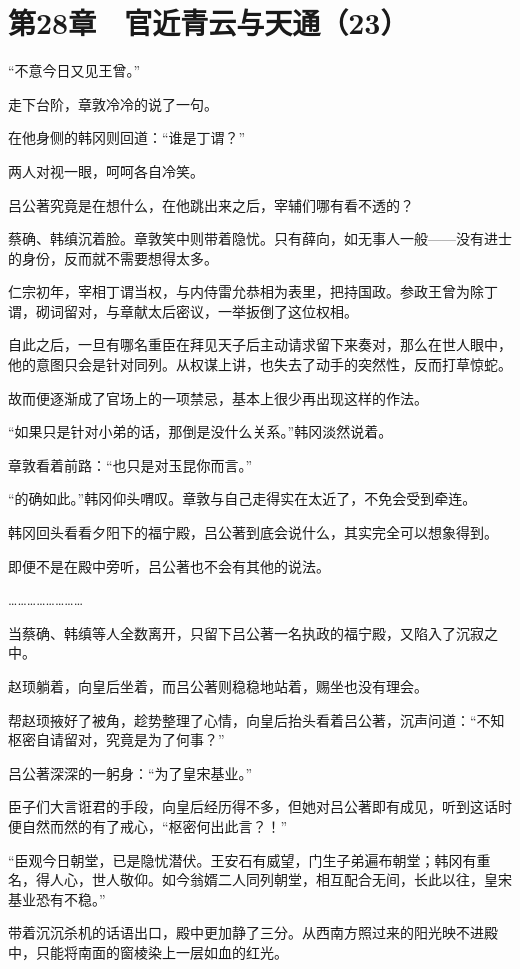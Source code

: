 \section{第28章　官近青云与天通（23）}

“不意今日又见王曾。”

走下台阶，章敦冷冷的说了一句。

在他身侧的韩冈则回道：“谁是丁谓？”

两人对视一眼，呵呵各自冷笑。

吕公著究竟是在想什么，在他跳出来之后，宰辅们哪有看不透的？

蔡确、韩缜沉着脸。章敦笑中则带着隐忧。只有薛向，如无事人一般——没有进士的身份，反而就不需要想得太多。

仁宗初年，宰相丁谓当权，与内侍雷允恭相为表里，把持国政。参政王曾为除丁谓，砌词留对，与章献太后密议，一举扳倒了这位权相。

自此之后，一旦有哪名重臣在拜见天子后主动请求留下来奏对，那么在世人眼中，他的意图只会是针对同列。从权谋上讲，也失去了动手的突然性，反而打草惊蛇。

故而便逐渐成了官场上的一项禁忌，基本上很少再出现这样的作法。

“如果只是针对小弟的话，那倒是没什么关系。”韩冈淡然说着。

章敦看着前路：“也只是对玉昆你而言。”

“的确如此。”韩冈仰头喟叹。章敦与自己走得实在太近了，不免会受到牵连。

韩冈回头看看夕阳下的福宁殿，吕公著到底会说什么，其实完全可以想象得到。

即便不是在殿中旁听，吕公著也不会有其他的说法。

……………………

当蔡确、韩缜等人全数离开，只留下吕公著一名执政的福宁殿，又陷入了沉寂之中。

赵顼躺着，向皇后坐着，而吕公著则稳稳地站着，赐坐也没有理会。

帮赵顼掖好了被角，趁势整理了心情，向皇后抬头看着吕公著，沉声问道：“不知枢密自请留对，究竟是为了何事？”

吕公著深深的一躬身：“为了皇宋基业。”

臣子们大言诳君的手段，向皇后经历得不多，但她对吕公著即有成见，听到这话时便自然而然的有了戒心，“枢密何出此言？！”

“臣观今日朝堂，已是隐忧潜伏。王安石有威望，门生子弟遍布朝堂；韩冈有重名，得人心，世人敬仰。如今翁婿二人同列朝堂，相互配合无间，长此以往，皇宋基业恐有不稳。”

带着沉沉杀机的话语出口，殿中更加静了三分。从西南方照过来的阳光映不进殿中，只能将南面的窗棱染上一层如血的红光。

